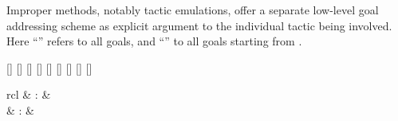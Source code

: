 \begin{isabellebody}
\begin{isamarkuptext}
  Improper methods, notably tactic emulations, offer a separate
  low-level goal addressing scheme as explicit argument to the
  individual tactic being involved.  Here ``'' refers to
  all goals, and ``'' to all goals starting from .

  \begin{railoutput}
[]
\rail@bar
{}[]
[]
[]
[]
[]
[]
[]
\rail@endbar
{}[]
\rail@end
\end{railoutput}%
\end{isamarkuptext}%
\isamarkuptrue%
%
\isamarkuptrue%
%
\begin{isamarkuptext}%
\begin{matharray}{rcl}
    \hypertarget{command.proof}{\hyperlink{command.proof}{\mbox{}}} & : &  \\
    \hypertarget{command.qed}{\hyperlink{command.qed}{\mbox{}}} & : &  \\

\end{matharray}
\end{isamarkuptext}
\end{isabellebody}
